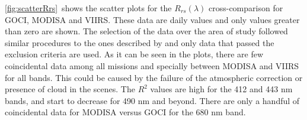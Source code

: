 \documentclass[onecolumn,3p,letterpaper,11pt]{elsarticle}
\begin{document}
% 
% 
% 
\autoref{fig:scatterRrs}~shows the scatter plots for the $R_{rs}(\lambda)$ cross-comparison for GOCI, MODISA and VIIRS. These data are daily values and only values greater than zero are shown. The selection of the data over the area of study followed similar procedures to the ones described by \cite{Bailey2006} and only data that passed the exclusion criteria are used. As it can be seen in the plots, there are few coincidental data among all missions and specially between MODISA and VIIRS for all bands. This could be caused by the failure of the atmospheric correction or presence of cloud in the scenes. The $R^2$ values are high for the 412 and 443 nm bands, and start to decrease for 490 nm and beyond. There are only a handful of coincidental data for MODISA versus GOCI for the 680 nm band.
\end{document}
